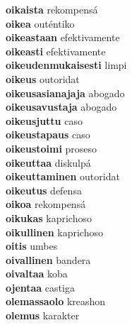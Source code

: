 \textbf{oikaista } rekompensá \\
\textbf{oikea } outéntiko \\
\textbf{oikeastaan } efektivamente \\
\textbf{oikeasti } efektivamente \\
\textbf{oikeudenmukaisesti } limpi \\
\textbf{oikeus } outoridat \\
\textbf{oikeusasianajaja } abogado \\
\textbf{oikeusavustaja } abogado \\
\textbf{oikeusjuttu } caso \\
\textbf{oikeustapaus } caso \\
\textbf{oikeustoimi } proseso \\
\textbf{oikeuttaa } diskulpá \\
\textbf{oikeuttaminen } outoridat \\
\textbf{oikeutus } defensa \\
\textbf{oikoa } rekompensá \\
\textbf{oikukas } kaprichoso \\
\textbf{oikullinen } kaprichoso \\
\textbf{oitis } umbes \\
\textbf{oivallinen } bandera \\
\textbf{oivaltaa } koba \\
\textbf{ojentaa } castiga \\
\textbf{olemassaolo } kreashon \\
\textbf{olemus } karakter \\
